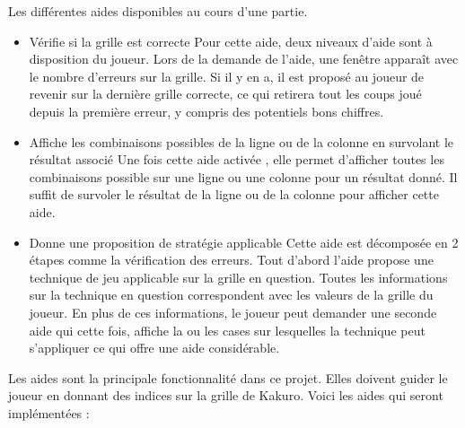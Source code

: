 {
    Les différentes aides disponibles au cours d'une partie.
    \begin{itemize}
		\item {} %
                {Vérifie si la grille est correcte} %
                {  %
                    Pour cette aide, deux niveaux d'aide sont à disposition du joueur. Lors de la demande de l'aide, une fenêtre apparaît avec le nombre d'erreurs sur la grille. Si il y en a, il est proposé au joueur de revenir sur la dernière grille correcte, ce qui retirera tout les coups joué depuis la première erreur, y compris des potentiels bons chiffres.
                } 
		\item {}
                {Affiche les combinaisons possibles de la ligne ou de la colonne en survolant le résultat associé}
                {
                    Une fois cette aide activée , elle permet d'afficher toutes les combinaisons possible sur une ligne ou une colonne pour un résultat donné. Il suffit de survoler le résultat de la ligne ou de la colonne pour afficher cette aide.
                }
            \item {}
                {Donne une proposition de stratégie applicable}
                {
                    Cette aide est décomposée en 2 étapes comme la vérification des erreurs. Tout d'abord l'aide propose une technique de jeu applicable sur la grille en question. Toutes les informations sur la technique en question correspondent avec les valeurs de la grille du joueur. En plus de ces informations, le joueur peut demander une seconde aide qui cette fois, affiche la ou les cases sur lesquelles la technique peut s'appliquer ce qui offre une aide considérable.
                }
	\end{itemize}
}
{
Les aides sont la principale fonctionnalité dans ce projet. Elles doivent guider le joueur en donnant des indices sur la grille de Kakuro. Voici les aides qui seront implémentées :
}